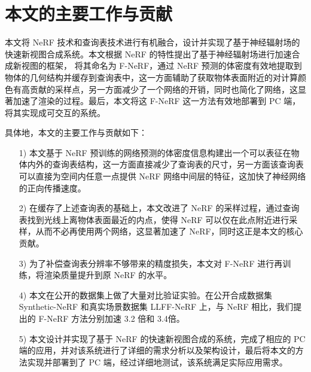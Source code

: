 \section{本文的主要工作与贡献}

本文将 NeRF 技术和查询表技术进行有机融合，设计并实现了基于神经辐射场的快速新视图合成系统。本文根据 NeRF 的特性提出了基于神经辐射场进行加速合成新视图的框架， 将其命名为 F-NeRF，通过 NeRF 预测的体密度有效地提取到物体的几何结构并缓存到查询表中，这一方面辅助了获取物体表面附近的对计算颜色有高贡献的采样点，另一方面减少了一个网络的开销，同时也简化了网络，这显著加速了渲染的过程。最后，本文将这 F-NeRF 这一方法有效地部署到 PC 端，将其实现成可交互的系统。

具体地，本文的主要工作与贡献如下：
\begin{enumerate}
    \item [1)] 本文基于 NeRF 预训练的网络预测的体密度信息构建出一个可以表征在物体内外的查询表结构，这一方面直接减少了查询表的尺寸，另一方面该查询表可以直接为空间内任意一点提供 NeRF 网络中间层的特征，这加快了神经网络的正向传播速度。
    \item [2)] 在缓存了上述查询表的基础上，本文改进了 NeRF 的采样过程，通过查询表找到光线上离物体表面最近的内点，使得 NeRF 可以仅在此点附近进行采样，从而不必再使用两个网络，这显著加速了 NeRF，同时这正是本文的核心贡献。
    \item [3)] 为了补偿查询表分辨率不够带来的精度损失，本文对 F-NeRF 进行再训练，将渲染质量提升到原 NeRF 的水平。
    \item [4)] 本文在公开的数据集上做了大量对比验证实验。在公开合成数据集 Synthetic-NeRF 和真实场景数据集 LLFF-NeRF 上，与 NeRF 相比，我们提出的 F-NeRF 方法分别加速 3.2 倍和 3.4倍。 
    \item [5)] 本文设计并实现了基于 NeRF 的快速新视图合成的系统，完成了相应的 PC 端的应用，并对该系统进行了详细的需求分析以及架构设计，最后将本文的方法实现并部署到了 PC 端，经过详细地测试，该系统满足实际应用需求。
\end{enumerate}



